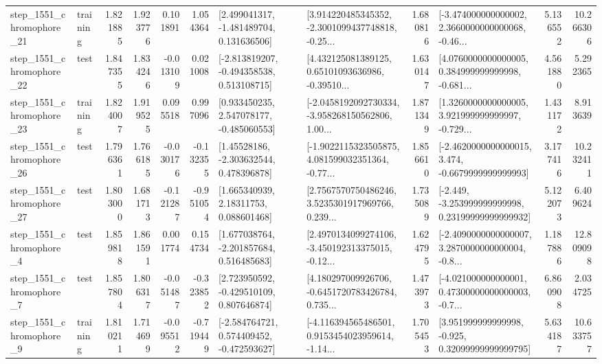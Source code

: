 \begin{tabular}{llrrrrllrlrr}
 step\_1551\_chromophore\_21 &  training &      1.821885 &    1.923776 &      0.101891 &  1.054364 &    [2.499041317, -1.481489704, 0.131636506] &  [3.914220485345352, -2.3001099437748818, -0.25... &       1.680816 &  [-3.474000000000002, 2.3660000000000068, -0.46... &            5.136552 &         10.266306 \\
 step\_1551\_chromophore\_22 &      test &      1.847355 &    1.834246 &     -0.013109 &  0.021008 &   [-2.813819207, -0.494358538, 0.513108715] &  [4.432125081389125, 0.65101093636986, -0.39510... &       1.630147 &  [4.0760000000000005, 0.384999999999998, -0.681... &            4.561880 &          5.292365 \\
 step\_1551\_chromophore\_23 &  training &      1.824007 &    1.919525 &      0.095518 &  0.997096 &    [0.933450235, 2.547078177, -0.485060553] &  [-2.0458192092730334, -3.958268150562806, 1.00... &       1.871349 &  [1.3260000000000005, 3.921999999999997, -0.729... &            1.431172 &          8.913639 \\
 step\_1551\_chromophore\_26 &      test &      1.796361 &    1.766185 &     -0.030176 & -0.132355 &     [1.45528186, -2.303632544, 0.478396878] &  [-1.9022115323505875, 4.081599032351364, -0.77... &       1.856610 &  [-2.4620000000000015, 3.474, -0.6679999999999993] &            3.177416 &         10.232411 \\
 step\_1551\_chromophore\_27 &      test &      1.803000 &    1.681713 &     -0.121287 & -0.951054 &      [1.665340939, 2.18311753, 0.088601468] &  [2.7567570750486246, 3.5235301917969766, 0.239... &       1.735089 &  [-2.449, -3.253999999999998, 0.23199999999999932] &            5.122073 &          6.409624 \\
  step\_1551\_chromophore\_4 &      test &      1.859818 &    1.861591 &      0.001774 &  0.154734 &    [1.677038764, -2.201857684, 0.516485683] &  [2.4970134099274106, -3.450192313375015, -0.12... &       1.624795 &  [-2.4090000000000007, 3.2870000000000004, -0.8... &            1.187886 &         12.809098 \\
  step\_1551\_chromophore\_7 &      test &      1.857804 &    1.806317 &     -0.051487 & -0.323852 &    [2.723950592, -0.429510109, 0.807646874] &  [4.180297009926706, -0.6451720783426784, 0.735... &       1.473973 &  [-4.021000000000001, 0.47300000000000003, -0.7... &            6.860908 &          2.034725 \\
  step\_1551\_chromophore\_9 &  training &      1.810211 &    1.714699 &     -0.095512 & -0.719449 &   [-2.584764721, 0.574409452, -0.472593627] &  [-4.116394565486501, 0.9153454023959614, -1.14... &       1.705453 &   [3.951999999999998, -0.925, 0.32099999999999795] &            5.634187 &         10.633757 \\

\end{tabular}
